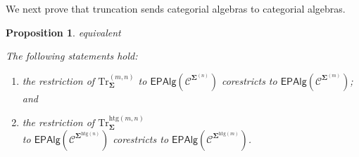 \documentclass[a4paper, reqno]{amsbook}
\makeatletter
\newcommand{\sig}[1]{\mathbf{#1}}             %
\newcommand{\spec}[1]{\boldsymbol{\mathcal{#1}}} %
\newcommand{\htg}{\mathrm{htg}}                %
\newcommand{\Tr}{\mathrm{Tr}}
\theoremstyle{plain}
\newtheorem{proposition}[theorem]{Proposition}
\theoremstyle{definition}
\newcommand*{\CA@leanpending}{}
\newcommand*{\CA@leanrelation}{}
\newcommand*{\lean}[2]{%
  \ifcsname\string\color@lean@#1\endcsname\else
    \PackageError{main}{Unknown relation `#1' in \string\lean}{Use equivalent, weaker or stronger.}%
  \fi
  \gdef\CA@leanrelation{#1}%
  \gdef\CA@leanpending{#2}}
\makeatother
\begin{document}
We next prove that truncation sends categorial algebras to categorial algebras.

\begin{proposition}\label{PTrEpVariety}\lean{equivalent}{Dimensions.homogeneousTruncation_isModel,Dimensions.heterogeneousTruncation_isModel}
The following statements hold:
\begin{enumerate}
\item the restriction of $\Tr^{(m,n)}_{\sig{\Sigma}}$ to $\mathsf{EPAlg}(\spec{C}^{\sig{\Sigma}^{(n)}})$ corestricts to $\mathsf{EPAlg}(\spec{C}^{\sig{\Sigma}^{(m)}})$; and
\item the restriction of $\Tr^{\htg(m,n)}_{\sig{\Sigma}}$\\ to $\mathsf{EPAlg}(\spec{C}^{\sig{\Sigma}^{\htg(n)}})$ corestricts to $\mathsf{EPAlg}(\spec{C}^{\sig{\Sigma}^{\htg(m)}})$.
\end{enumerate}
\end{proposition}
\end{document}
